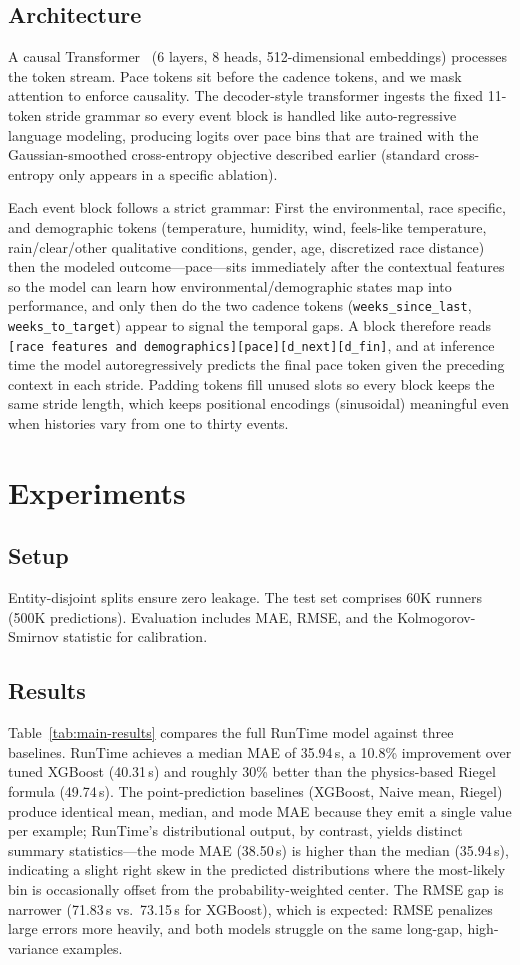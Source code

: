 \documentclass{article}
\begin{document}
\subsection{Architecture}
A causal Transformer~\cite{vaswani2017attention} (6 layers, 8 heads, 512-dimensional embeddings) processes the token stream. Pace tokens sit before the cadence tokens, and we mask attention to enforce causality. The decoder-style transformer ingests the fixed 11-token stride grammar so every event block is handled like auto-regressive language modeling, producing logits over pace bins that are trained with the Gaussian-smoothed cross-entropy objective described earlier (standard cross-entropy only appears in a specific ablation).

Each event block follows a strict grammar: First the environmental, race specific, and demographic tokens (temperature, humidity, wind, feels-like temperature, rain/clear/other qualitative conditions, gender, age, discretized race distance) then the modeled outcome—pace—sits immediately after the contextual features so the model can learn how environmental/demographic states map into performance, and only then do the two cadence tokens (\texttt{weeks\_since\_last}, \texttt{weeks\_to\_target}) appear to signal the temporal gaps. A block therefore reads \texttt{[race features and demographics][pace][d\_next][d\_fin]}, and at inference time the model autoregressively predicts the final pace token given the preceding context in each stride. Padding tokens fill unused slots so every block keeps the same stride length, which keeps positional encodings (sinusoidal) meaningful even when histories vary from one to thirty events.
\section{Experiments}
\subsection{Setup}
Entity-disjoint splits ensure zero leakage. The test set comprises 60K runners (500K predictions). Evaluation includes MAE, RMSE, and the Kolmogorov-Smirnov statistic for calibration.
\subsection{Results}
Table~\ref{tab:main-results} compares the full RunTime model against three baselines. RunTime achieves a median MAE of 35.94\,s, a 10.8\% improvement over tuned XGBoost (40.31\,s) and roughly 30\% better than the physics-based Riegel formula (49.74\,s). The point-prediction baselines (XGBoost, Naive mean, Riegel) produce identical mean, median, and mode MAE because they emit a single value per example; RunTime's distributional output, by contrast, yields distinct summary statistics---the mode MAE (38.50\,s) is higher than the median (35.94\,s), indicating a slight right skew in the predicted distributions where the most-likely bin is occasionally offset from the probability-weighted center. The RMSE gap is narrower (71.83\,s vs.\ 73.15\,s for XGBoost), which is expected: RMSE penalizes large errors more heavily, and both models struggle on the same long-gap, high-variance examples.
\end{document}
